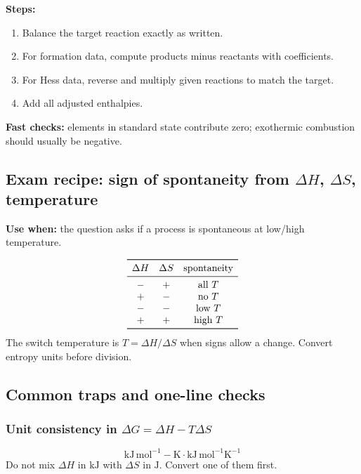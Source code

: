 \textbf{Steps:}
\begin{enumerate}
    \item Balance the target reaction exactly as written.
    \item For formation data, compute products minus reactants with coefficients.
    \item For Hess data, reverse and multiply given reactions to match the target.
    \item Add all adjusted enthalpies.
\end{enumerate}

\textbf{Fast checks:} elements in standard state contribute zero; exothermic combustion should usually be negative.

\subsection{Exam recipe: sign of spontaneity from \(\Delta H\), \(\Delta S\), temperature}
\textbf{Use when:} the question asks if a process is spontaneous at low/high temperature.

\[
\begin{array}{c c c}
\toprule
\Delta H & \Delta S & \text{spontaneity}\\
\midrule
- & + & \text{all }T\\
+ & - & \text{no }T\\
- & - & \text{low }T\\
+ & + & \text{high }T\\
\bottomrule
\end{array}
\]
The switch temperature is \(T=\Delta H/\Delta S\) when signs allow a change. Convert entropy units before division.

\subsection{Common traps and one-line checks}
\subsubsection{Unit consistency in \(\Delta G=\Delta H-T\Delta S\)}
\[
\mathrm{kJ\,mol^{-1}}-\mathrm{K}\cdot\mathrm{kJ\,mol^{-1}K^{-1}}
\]
Do not mix \(\Delta H\) in \(\mathrm{kJ}\) with \(\Delta S\) in \(\mathrm J\). Convert one of them first.
